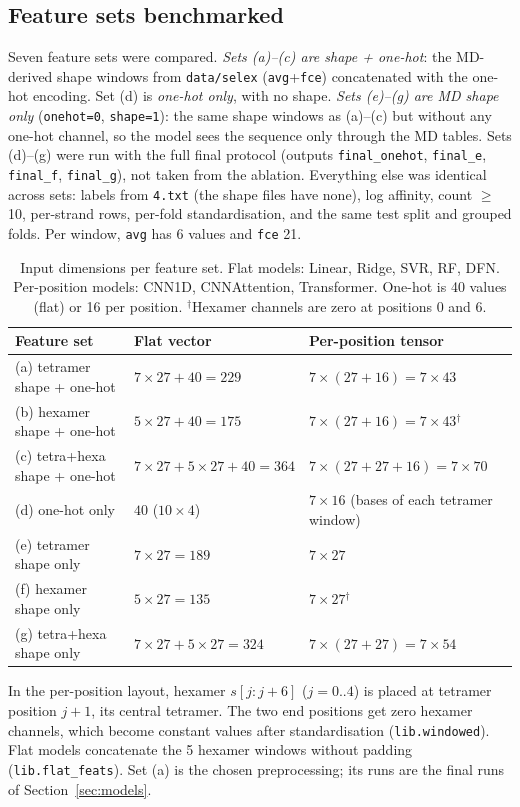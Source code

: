 \subsection{Feature sets benchmarked}\label{sec:fs}
Seven feature sets were compared. \emph{Sets (a)--(c) are shape + one-hot}: the MD-derived shape windows from \texttt{data/selex} (\texttt{avg}+\texttt{fce}) concatenated with the one-hot encoding. Set (d) is \emph{one-hot only}, with no shape. \emph{Sets (e)--(g) are MD shape only} (\texttt{onehot=0}, \texttt{shape=1}): the same shape windows as (a)--(c) but without any one-hot channel, so the model sees the sequence only through the MD tables. Sets (d)--(g) were run with the full final protocol (outputs \texttt{final\_onehot}, \texttt{final\_e}, \texttt{final\_f}, \texttt{final\_g}), not taken from the ablation. Everything else was identical across sets: labels from \texttt{4.txt} (the shape files have none), log affinity, count $\geq$10, per-strand rows, per-fold standardisation, and the same test split and grouped folds. Per window, \texttt{avg} has 6 values and \texttt{fce} 21.
\begin{table}[H]\centering\footnotesize
\caption{Input dimensions per feature set. Flat models: Linear, Ridge, SVR, RF, DFN. Per-position models: CNN1D, CNNAttention, Transformer. One-hot is 40 values (flat) or 16 per position. $^\dagger$Hexamer channels are zero at positions 0 and 6.}
\begin{tabular}{lll}\toprule
Feature set & Flat vector & Per-position tensor\\\midrule
(a) tetramer shape + one-hot & $7\times27+40=229$ & $7\times(27+16)=7\times43$\\
(b) hexamer shape + one-hot & $5\times27+40=175$ & $7\times(27+16)=7\times43$$^\dagger$\\
(c) tetra+hexa shape + one-hot & $7\times27+5\times27+40=364$ & $7\times(27+27+16)=7\times70$\\
(d) one-hot only & $40$ ($10\times4$) & $7\times16$ (bases of each tetramer window)\\
(e) tetramer shape only & $7\times27=189$ & $7\times27$\\
(f) hexamer shape only & $5\times27=135$ & $7\times27$$^\dagger$\\
(g) tetra+hexa shape only & $7\times27+5\times27=324$ & $7\times(27+27)=7\times54$\\\bottomrule
\end{tabular}\label{tab:dims}\end{table}
In the per-position layout, hexamer $s[j{:}j{+}6]$ ($j=0..4$) is placed at tetramer position $j{+}1$, its central tetramer. The two end positions get zero hexamer channels, which become constant values after standardisation (\texttt{lib.windowed}). Flat models concatenate the 5 hexamer windows without padding (\texttt{lib.flat\_feats}). Set (a) is the chosen preprocessing; its runs are the final runs of Section~\ref{sec:models}.

